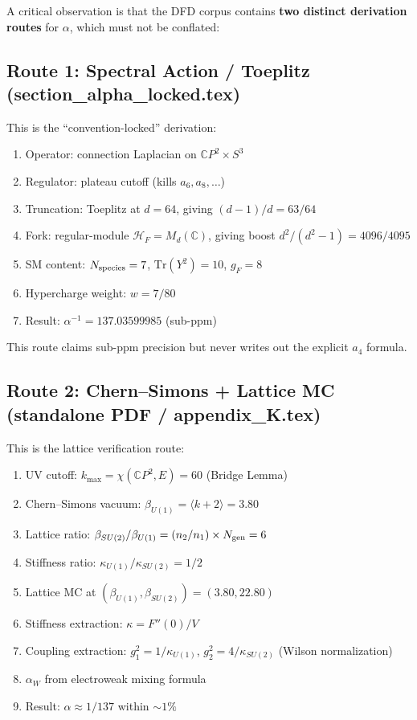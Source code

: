 \documentclass[12pt,a4paper]{article}
\begin{document}
A critical observation is that the DFD corpus contains \textbf{two distinct
derivation routes} for $\alpha$, which must not be conflated:

\subsection{Route 1: Spectral Action / Toeplitz (section\_alpha\_locked.tex)}

This is the ``convention-locked'' derivation:
\begin{enumerate}
\item Operator: connection Laplacian on $\mathbb{C}P^2 \times S^3$
\item Regulator: plateau cutoff (kills $a_6, a_8, \ldots$)
\item Truncation: Toeplitz at $d = 64$, giving $(d-1)/d = 63/64$
\item Fork: regular-module $\mathcal{H}_F = M_d(\mathbb{C})$, giving
  boost $d^2/(d^2-1) = 4096/4095$
\item SM content: $N_{\rm species} = 7$, $\mathrm{Tr}(Y^2) = 10$, $g_F = 8$
\item Hypercharge weight: $w = 7/80$
\item Result: $\alpha^{-1} = 137.03599985$ (sub-ppm)
\end{enumerate}

This route claims sub-ppm precision but never writes out the explicit
$a_4$ formula.

\subsection{Route 2: Chern--Simons + Lattice MC (standalone PDF / appendix\_K.tex)}

This is the lattice verification route:
\begin{enumerate}
\item UV cutoff: $k_{\max} = \chi(\mathbb{C}P^2, E) = 60$ (Bridge Lemma)
\item Chern--Simons vacuum: $\beta_{U(1)} = \langle k+2 \rangle = 3.80$
\item Lattice ratio: $\beta_{SU(2)}/\beta_{U(1)} = (n_2/n_1) \times N_{\rm gen} = 6$
\item Stiffness ratio: $\kappa_{U(1)}/\kappa_{SU(2)} = 1/2$
\item Lattice MC at $(\beta_{U(1)}, \beta_{SU(2)}) = (3.80, 22.80)$
\item Stiffness extraction: $\kappa = F''(0)/V$
\item Coupling extraction: $g_1^2 = 1/\kappa_{U(1)}$,
  $g_2^2 = 4/\kappa_{SU(2)}$ (Wilson normalization)
\item $\alpha_W$ from electroweak mixing formula
\item Result: $\alpha \approx 1/137$ within $\sim 1\%$
\end{enumerate}
\end{document}
